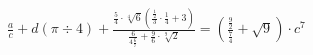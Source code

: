 \documentclass[10pt,a4paper]{article}
\begin{document}
    \begin{math}
        \frac{a}{c} + d(\pi \div 4) + \frac{\frac{5}{4} \cdot \sqrt[4]{6} \left(\frac{\frac{1}{2}}{3} \cdot \frac{1}{4} + 3 \right)}{\frac{6}{4 \frac{6}{7}} + \frac{9}{6} \cdot \sqrt[9]{2}}
        = \left(\frac{\frac{9}{2}}{\frac{7}{4}} + \sqrt{9} \right) \cdot c^7
    \end{math}
\end{document}
